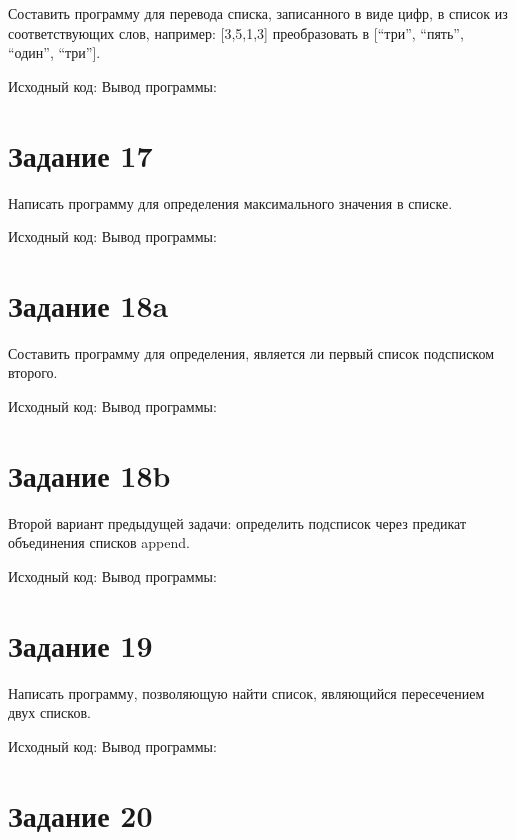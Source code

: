 \documentclass[a4paper,14pt]{article}
\begin{document}
    Составить программу для перевода списка, записанного в виде цифр, в список из соответствующих слов, например:
    [3,5,1,3]  преобразовать в [“три”, “пять”, “один”, “три”].


    Исходный код:
    {\small {}}
    Вывод программы:
    {\small {}}


    \section*{Задание 17}

    Написать программу для определения максимального значения в списке.


    Исходный код:
    {\small {}}
    Вывод программы:
    {\small {}}


    \section*{Задание 18a}

    Составить программу для определения, является ли первый список подсписком второго.


    Исходный код:
    {\small {}}
    Вывод программы:
    {\small {}}

    \section*{Задание 18b}
    Второй вариант предыдущей задачи: определить подсписок через предикат объединения списков append.

    Исходный код:
    {\small {}}
    Вывод программы:
    {\small {}}

    \section*{Задание 19}

    Написать программу, позволяющую найти список, являющийся пересечением двух списков.

    Исходный код:
    {\small {}}
    Вывод программы:
    {\small {}}


    \section*{Задание 20}
\end{document}
